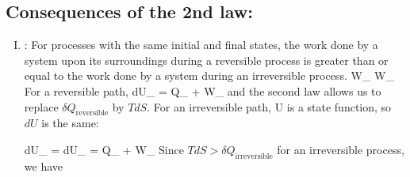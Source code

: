 \documentclass[12pt]{article}
\begin{document}
\subsection{Consequences of the 2nd law:}
\begin{enumerate}[(I)]
\item {}: For processes with the same initial and final states, the work done by a system upon its surroundings during a reversible process is greater than or equal to the work done by a system during an irreversible process.
\beq \delta W_ \geq \delta W_ \ceq
For a reversible path, \beq dU_ = \delta Q_ + \delta W_ \ceq
and the second law allows us to replace $\delta Q_\text{reversible}$ by $TdS$.  For an irreversible path, U is a state function, so $dU$ is the same:

\beq dU_ = dU_  = \delta Q_ + \delta W_ \ceq
Since $T dS > \delta Q_\text{irreversible} $ for an irreversible process, we have


\end{enumerate}
\end{document}

